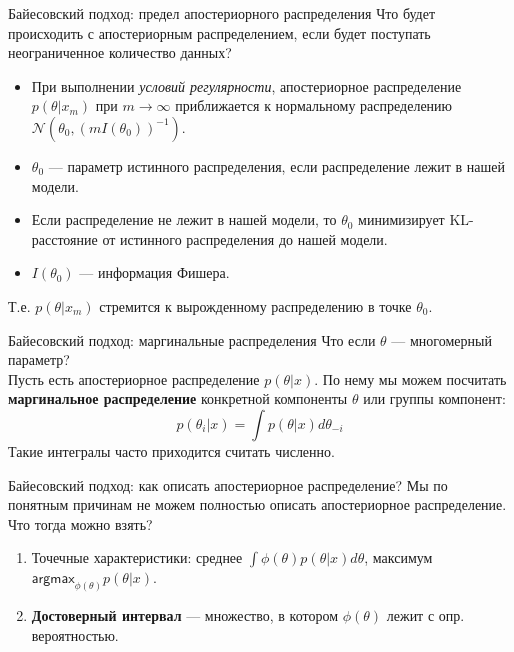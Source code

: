 \documentclass[handout]{beamer}
\begin{document}
\begin{frame}{Байесовский подход: предел апостериорного распределения}
	Что будет происходить с апостериорным распределением, если будет поступать неограниченное количество данных?\\
	\begin{itemize}
		\item При выполнении \textit{условий регулярности}, апостериорное распределение $p(\theta |x_m)$ при $m \rightarrow \infty$ приближается к нормальному распределению $\mathcal{N}(\theta_0,(mI(\theta_0))^{-1})$.
		\item $\theta_0$ --- параметр истинного распределения, если распределение лежит в нашей модели.
		\item Если распределение не лежит в нашей модели, то $\theta_0$ минимизирует KL-расстояние от истинного распределения до нашей модели.
		\item $I(\theta_0)$ --- информация Фишера.  
	\end{itemize}
	Т.е. $p(\theta | x_m)$ стремится к вырожденному распределению в точке $\theta_0$.
\end{frame}

\begin{frame}{Байесовский подход: маргинальные распределения}
	Что если $\theta$ --- многомерный параметр?\\
	Пусть есть апостериорное распределение $p(\theta | x)$. По нему мы можем посчитать \textbf{маргинальное распределение} конкретной компоненты $\theta$ или группы компонент:
	\begin{equation*}
		p(\theta_i | x) = \int p(\theta | x)d\theta_{-i}
	\end{equation*}
	Такие интегралы часто приходится считать численно.
\end{frame}

\begin{frame}{Байесовский подход: как описать апостериорное распределение?}
	Мы по понятным причинам не можем полностью описать апостериорное распределение.\\
	Что тогда можно взять?
	\begin{enumerate}
		\item Точечные характеристики: среднее $\int \phi(\theta)p(\theta | x)d\theta$, максимум $\mathsf{argmax}_{\phi(\theta)}p(\theta | x)$.
		\item \textbf{Достоверный интервал} --- множество, в котором $\phi(\theta)$ лежит с опр. вероятностью.
	\end{enumerate}
\end{frame}
\end{document}
